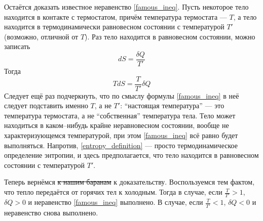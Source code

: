 \documentclass{article}
\begin{document}
Остаётся доказать известное неравенство \eqref{famous_ineq}. 
Пусть некоторое тело находится в контакте с термостатом, причём 
температура термостата --- $T$, а
тело находится в термодинамически равновесном состоянии с температурой $T'$ (возможно,
отличной от $T$).
Раз тело находится в равновесном состоянии, можно записать 
\begin{equation}
	\label{entropy_definition}
	dS = \frac{\delta Q}{T'}
\end{equation}
Тогда 
\begin{equation}
	TdS = \frac{T}{T'} \delta Q
\end{equation}
Следует ещё раз подчеркнуть, что по смыслу формулы \eqref{famous_ineq} в неё следует
подставить именно $T$, а не $T'$: ``настоящая температура'' --- это температура термостата,
а не ``собственная'' температура тела. Тело может находиться в каком--нибудь крайне 
неравновесном состоянии, вообще не характеризующемся температурой, при этом 
\eqref{famous_ineq} всё равно будет выполняться. Напротив, \eqref{entropy_definition} ---
просто термодинамическое определение энтропии, и здесь предполагается, что тело находится
в равновесном состоянии с температурой $T'$.

Теперь вернёмся \sout{к нашим баранам} к доказательству. Воспользуемся тем фактом,
 что тепло передаётся от горячих тел к холодным. Тогда в случае, если $\frac{T}{T'} > 1$,
$\delta Q > 0$ и неравенство \eqref{famous_ineq} выполнено. В случае, если $\frac{T}{T'} < 1$,
$\delta Q < 0$ и неравенство снова выполнено.
\end{document}
